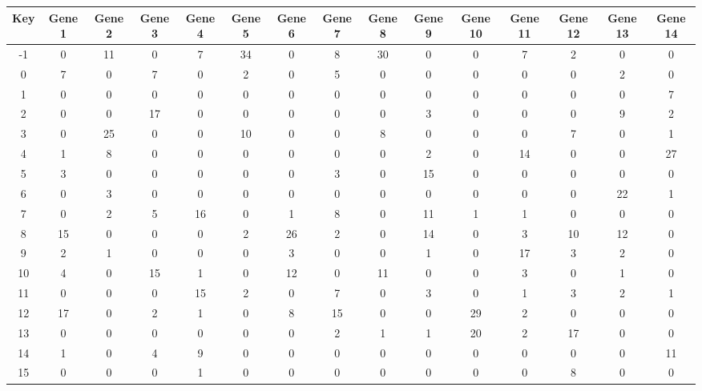 \begin{tabular}{|c|c|c|c|c|c|c|c|c|c|c|c|c|c|c|}
\hline
Key & Gene 1 & Gene 2 & Gene 3 & Gene 4 & Gene 5 & Gene 6 & Gene 7 & Gene 8 & Gene 9 & Gene 10 & Gene 11 & Gene 12 & Gene 13 & Gene 14 \\
\hline
-1 & 0 & 11 & 0 & 7 & 34 & 0 & 8 & 30 & 0 & 0 & 7 & 2 & 0 & 0 \\
0 & 7 & 0 & 7 & 0 & 2 & 0 & 5 & 0 & 0 & 0 & 0 & 0 & 2 & 0 \\
1 & 0 & 0 & 0 & 0 & 0 & 0 & 0 & 0 & 0 & 0 & 0 & 0 & 0 & 7 \\
2 & 0 & 0 & 17 & 0 & 0 & 0 & 0 & 0 & 3 & 0 & 0 & 0 & 9 & 2 \\
3 & 0 & 25 & 0 & 0 & 10 & 0 & 0 & 8 & 0 & 0 & 0 & 7 & 0 & 1 \\
4 & 1 & 8 & 0 & 0 & 0 & 0 & 0 & 0 & 2 & 0 & 14 & 0 & 0 & 27 \\
5 & 3 & 0 & 0 & 0 & 0 & 0 & 3 & 0 & 15 & 0 & 0 & 0 & 0 & 0 \\
6 & 0 & 3 & 0 & 0 & 0 & 0 & 0 & 0 & 0 & 0 & 0 & 0 & 22 & 1 \\
7 & 0 & 2 & 5 & 16 & 0 & 1 & 8 & 0 & 11 & 1 & 1 & 0 & 0 & 0 \\
8 & 15 & 0 & 0 & 0 & 2 & 26 & 2 & 0 & 14 & 0 & 3 & 10 & 12 & 0 \\
9 & 2 & 1 & 0 & 0 & 0 & 3 & 0 & 0 & 1 & 0 & 17 & 3 & 2 & 0 \\
10 & 4 & 0 & 15 & 1 & 0 & 12 & 0 & 11 & 0 & 0 & 3 & 0 & 1 & 0 \\
11 & 0 & 0 & 0 & 15 & 2 & 0 & 7 & 0 & 3 & 0 & 1 & 3 & 2 & 1 \\
12 & 17 & 0 & 2 & 1 & 0 & 8 & 15 & 0 & 0 & 29 & 2 & 0 & 0 & 0 \\
13 & 0 & 0 & 0 & 0 & 0 & 0 & 2 & 1 & 1 & 20 & 2 & 17 & 0 & 0 \\
14 & 1 & 0 & 4 & 9 & 0 & 0 & 0 & 0 & 0 & 0 & 0 & 0 & 0 & 11 \\
15 & 0 & 0 & 0 & 1 & 0 & 0 & 0 & 0 & 0 & 0 & 0 & 8 & 0 & 0 \\
\hline
\end{tabular}